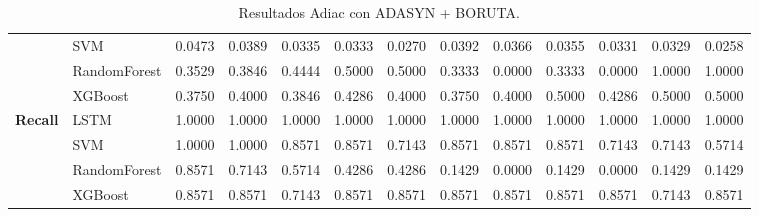 \begin{table}[h]
\begin{adjustbox}{max width=15cm}
\begin{tabular}{|c|l|r|r|r|r|r|r|r|r|r|r|r|}
			& SVM &  0.0473 &  0.0389 &  0.0335 &  0.0333 &  0.0270 &  0.0392 &  0.0366 &  0.0355 &  0.0331 &  0.0329 &  0.0258 \\
			& RandomForest &  0.3529 &  0.3846 &  0.4444 &  0.5000 &  0.5000 &  0.3333 &  0.0000 &  0.3333 &  0.0000 &  1.0000 &  1.0000 \\
			& XGBoost &  0.3750 &  0.4000 &  0.3846 &  0.4286 &  0.4000 &  0.3750 &  0.4000 &  0.5000 &  0.4286 &  0.5000 &  0.5000 \\
			\hline
			\textbf{Recall} & LSTM &  1.0000 &  1.0000 &  1.0000 &  1.0000 &  1.0000 &  1.0000 &  1.0000 &  1.0000 &  1.0000 &  1.0000 &  1.0000 \\
			& SVM &  1.0000 &  1.0000 &  0.8571 &  0.8571 &  0.7143 &  0.8571 &  0.8571 &  0.8571 &  0.7143 &  0.7143 &  0.5714 \\
			& RandomForest &  0.8571 &  0.7143 &  0.5714 &  0.4286 &  0.4286 &  0.1429 &  0.0000 &  0.1429 &  0.0000 &  0.1429 &  0.1429 \\
			& XGBoost &  0.8571 &  0.8571 &  0.7143 &  0.8571 &  0.8571 &  0.8571 &  0.8571 &  0.8571 &  0.8571 &  0.7143 &  0.8571 \\
			\hline
		\end{tabular}
	\end{adjustbox}
	\caption{Resultados Adiac con ADASYN + BORUTA.}
	\label{tab:Adiac_ADASYN_BORUTA}
\end{table}

